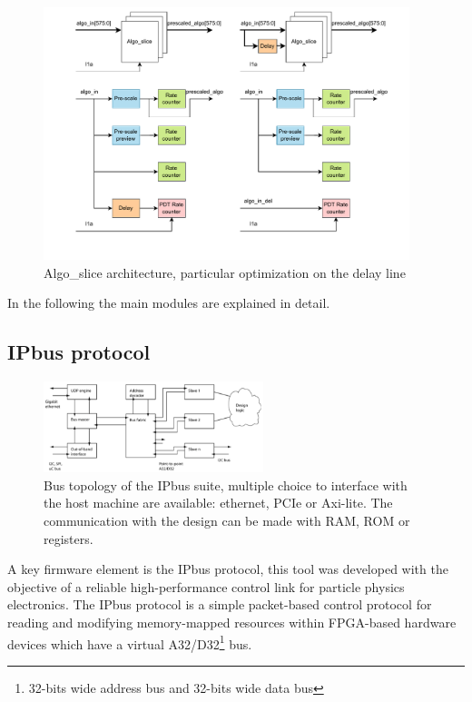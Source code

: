 \documentclass[../../main.tex]{subfiles}
\begin{document}
\begin{figure}[h]
    \centering
    \includegraphics[width=0.95\textwidth]{sections/06/Images/Algo_slice_mod.pdf}
    \caption{Algo\_slice architecture, particular optimization on the delay line}
    \label{fig:Algo_slice}
\end{figure}

In the following the main modules are explained in detail.

\subsection{IPbus protocol}
\label{sec:IPbus}

\begin{figure}[h]
    \centering
    \includegraphics[width=0.57\textwidth]{sections/06/Images/bus_topology.png}
    \caption{Bus topology of the IPbus suite, multiple choice to interface with the host machine are available: ethernet, PCIe or Axi-lite. The communication with the design can be made with RAM, ROM or registers.   }
    \label{fig:Ipbus}
\end{figure}

A key firmware element is the IPbus protocol\cite{IPbus}, this tool was developed with the objective of a reliable high-performance control link for particle physics electronics. The IPbus protocol is a simple packet-based control protocol for reading and modifying memory-mapped resources within FPGA-based hardware devices which have a virtual A32/D32\footnote{32-bits wide address bus and 32-bits wide data bus} bus.   
\end{document}
